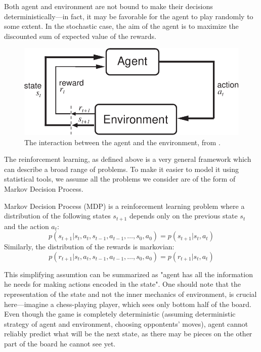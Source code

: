 Both agent and environment are not bound to make their decisions deterministically---in fact, it may be favorable for the agent to play randomly to some extent. In the stochastic case, the aim of the agent is to maximize the discounted sum of expected value of the rewards.

\begin{figure}[!h]
  \center
  \includegraphics[scale=0.8]{images/Agent-Env-crop.pdf}
  \caption{The interaction between the agent and the environment, from \cite{reinforcement-book}.}
\end{figure}

The reinforcement learning, as defined above is a very general framework which can describe a broad range of problems. To make it easier to model it using statistical tools, we assume all the problems we consider are of the form of Markov Decision Process.

Markov Decision Process (MDP) is a reinforcement learning problem where a distribution of the following states $s_{t+1}$ depends only on the previous state $s_t$ and the action $a_t$:
\begin{equation} \label{mdp}
  p(s_{t+1}|s_t, a_t, s_{t-1}, a_{t-1}, \ldots, s_0, a_0) = p(s_{t+1}|s_t, a_t)
\end{equation}
Similarly, the distribution of the rewards is markovian:
\begin{equation} \label{mdp-reward}
  p(r_{t+1}|s_t, a_t, s_{t-1}, a_{t-1}, \ldots, s_0, a_0) = p(r_{t+1}|s_t, a_t)
\end{equation}

This simplifying assumtion can be summarized as "agent has all the information he needs for making actions encoded in the state". One should note that the representation of the state and not the inner mechanics of environment, is crucial here---imagine a chess-playing player, which sees only bottom half of the board. Even though the game is completely deterministic (assuming deterministic strategy of agent and environment, choosing oppontents' moves), agent cannot reliably predict what will be the next state, as there may be pieces on the other part of the board he cannot see yet.

